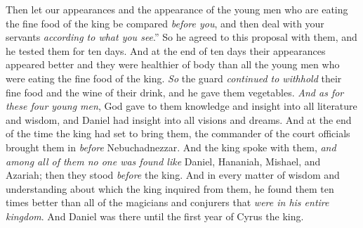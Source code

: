 \begin{biblechapter}
\verse Then let our appearances and the appearance of the young men who are eating the fine food of the king be compared \textit{before you}, and then deal with your servants \textit{according to what you see}.”
\verse So he agreed to this proposal with them, and he tested them for ten days.
\verse And at the end of ten days their appearances appeared better and they were healthier of body than all the young men who were eating the fine food of the king.
\verse \textit{So} the guard \textit{continued to withhold} their fine food and the wine of their drink, and he gave them vegetables.
\verse \textit{And as for these four young men}, God gave to them knowledge and insight into all literature and wisdom, and Daniel had insight into all visions and dreams.
\verse And at the end of the time the king had set to bring them, the commander of the court officials brought them in \textit{before} Nebuchadnezzar.
\verse And the king spoke with them, \textit{and among all of them no one was found like} Daniel, Hananiah, Mishael, and Azariah; then they stood \textit{before} the king.
\verse And in every matter of wisdom and understanding about which the king inquired from them, he found them ten times better than all of the magicians and conjurers that \textit{were in his entire kingdom}.
\verse And Daniel was there until the first year of Cyrus the king.
\end{biblechapter}

